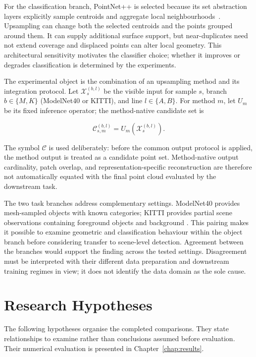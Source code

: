 For the classification branch, PointNet++ is selected because its set
abstraction layers explicitly sample centroids and aggregate local
neighbourhoods~\cite{qi2017pointnetpp}. Upsampling can change both the
selected centroids and the points grouped around them. It can supply
additional surface support, but near-duplicates need not extend coverage
and displaced points can alter local geometry. This architectural
sensitivity motivates the classifier choice; whether it improves or
degrades classification is determined by the experiments.

The experimental object is the combination of an upsampling method and
its integration protocol. Let $\mathcal X_s^{(b,l)}$ be the visible input
for sample $s$, branch $b\in\{M,K\}$ (ModelNet40 or KITTI), and line
$l\in\{A,B\}$. For method $m$, let $U_m$ be its fixed inference operator;
the method-native candidate set is

\begin{equation}
\mathcal{C}_{s,m}^{(b,l)}=U_m(\mathcal{X}_{s}^{(b,l)}).
\label{eq:fc-3-1}
\end{equation}

The symbol \ensuremath{\mathcal{C}} is used deliberately: before the common output protocol is applied, the method output is treated as a candidate point set. Method-native output cardinality, patch overlap, and representation-specific reconstruction are therefore not automatically equated with the final point cloud evaluated by the downstream task.


The two task branches address complementary settings. ModelNet40 provides
mesh-sampled objects with known categories; KITTI provides partial scene
observations containing foreground objects and background
\cite{wu2015modelnet,geiger2013kitti}. This pairing makes it possible to
examine geometric and classification behaviour within the object branch
before considering transfer to scene-level detection. Agreement between
the branches would support the finding across the tested settings.
Disagreement must be interpreted with their different data preparation
and downstream training regimes in view; it does not identify the data
domain as the sole cause.

\section{Research Hypotheses}
\label{sec:research-hypotheses}

The following hypotheses organise the completed comparisons. They state
relationships to examine rather than conclusions assumed before
evaluation. Their numerical evaluation is presented in
Chapter~\ref{chap:results}.


